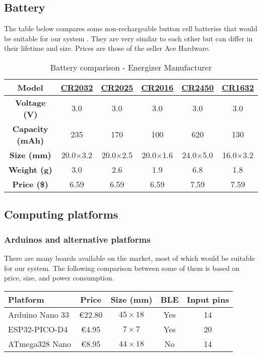 \subsection{Battery}
The table below compares some non-rechargeable button cell batteries that would be suitable for our system \cite{b7}.
They are very similar to each other but can differ in their lifetime and size. Prices are those of the seller Ace Hardware.
\begin{table}[!h]
    \scriptsize
    \centering
    \begin{tabular}{c c c c c c}
        \hline
        \textbf{Model} & \href{https://www.energizer.com/specialty-batteries/2032-battery}{CR2032} & \href{https://www.energizer.com/specialty-batteries/2025-battery}{CR2025} & \href{https://www.energizer.com/specialty-batteries/2016-battery}{CR2016} & \href{https://www.energizer.com/specialty-batteries/2450-battery}{CR2450} & \href{https://www.energizer.com/specialty-batteries/1632-battery}{CR1632}\\
        \hline
        \textbf{Voltage (V)} & 3.0 & 3.0 & 3.0 & 3.0 & 3.0\\
        \textbf{Capacity (mAh)} & 235 & 170 & 100 & 620 & 130\\
        \textbf{Size (mm)} & 20.0×3.2 & 20.0×2.5 & 20.0×1.6 & 24.0×5.0 & 16.0×3.2\\
        \textbf{Weight (g)} & 3.0 & 2.6 & 1.9 & 6.8 & 1.8\\
        \textbf{Price (\$)} & 6.59 & 6.59 & 6.59 & 7.59 & 7.59\\
        \hline
        \end{tabular}
    \caption{Battery comparison - Energizer Manufacturer}
    \label{tab:battery_comparison}
\end{table}

\subsection{Computing platforms}
\subsubsection{Arduinos and alternative platforms}
There are many boards available on the market, most of which would be suitable for
our system. The following comparison between some of them is based on price, size,
and power consumption.
\begin{table}
    \renewcommand{\arraystretch}{2}
    \begin{tabularx}{\columnwidth}{|l|c|c|c|c|}
        \hline
        \textbf{Platform} & \textbf{Price} & \textbf{Size (mm)} & \textbf{BLE} & \textbf{Input pins} \\
        \hline
        Arduino Nano 33 & €22.80 & $45 \times 18$ & Yes & 14 \\
        \hline
        ESP32-PICO-D4 & €4.95 & $7 \times 7$ & Yes & 20 \\
        \hline
        ATmega328 Nano & €8.95 & $44 \times 18$ & No & 14 \\
        \hline
    \end{tabularx}
\end{table}

